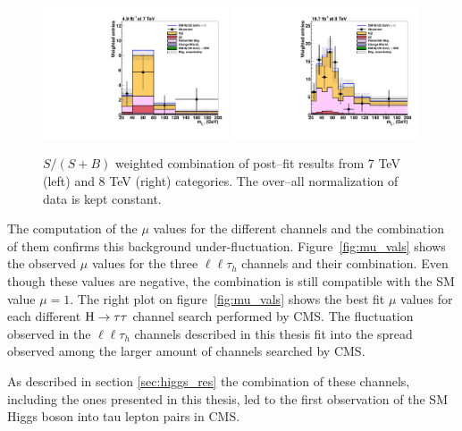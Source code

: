 \begin{figure}
\begin{center}
  \includegraphics[width=0.49\textwidth]{4_Analisys/pics/postfit/postfit_ssb_weight_7TeV.pdf}
  \includegraphics[width=0.49\textwidth]{4_Analisys/pics/postfit/postfit_ssb_weight_8TeV.pdf}\\
  \caption{$S / (S+B)$ weighted combination of post--fit results from 7 TeV (left) and 8 TeV (right) categories. The over--all normalization of data is kept constant.}
  \label{fig:sbweight}
\end{center}
\end{figure}


{\color{red}
The computation of the $\mu$ values for the different channels and the combination of them confirms this background under-fluctuation. Figure~\ref{fig:mu_vals} shows the observed $\mu$ values for the three $\ell\ell\tau_h$ channels and their combination. Even though these values are negative, the combination is still compatible with the SM value $\mu = 1$. The right plot on figure~\ref{fig:mu_vals} shows the best fit $\mu$ values for each different $\mathrm{H}\rightarrow\tau\tau$ channel search performed by CMS. The fluctuation observed in the $\ell\ell\tau_h$ channels described in this thesis fit into the spread observed among the larger amount of channels searched by CMS. 

As described in section \ref{sec:higgs_res} the combination of these channels, including the ones presented in this thesis, led to the first observation of the SM Higgs boson into tau lepton pairs in CMS.
}

